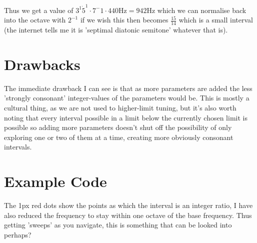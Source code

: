 \documentclass[10pt,a4paper]{article}
\begin{document}
Thus we get a value of $3^1 \dot 5^1 \cdot 7^-1 \cdot 440\si{\hertz} = 942\si{\hertz}$ which we can
normalise back into the octave with $2^{-1}$ if we wish this then becomes $\frac{15}{14}$ which is
a small interval (the internet tells me it is 'septimal diatonic semitone' whatever that is).

\section{Drawbacks}
The immediate drawback I can see is that as more parameters are added the less 'strongly consonant'
integer-values of the parameters would be. This is mostly a cultural thing, as we are not used to
higher-limit tuning, but it's also worth noting that every interval possible in a limit below the
currently chosen limit is possible so adding more parameters doesn't shut off the possibility of
only exploring one or two of them at a time, creating more obviously consonant intervals.

\section{Example Code}
The 1px red dots show the points as which the interval is an integer ratio, I have also reduced the
frequency to stay within one octave of the base frequency. Thus getting 'sweeps' as you navigate,
this is something that can be looked into perhaps?
\end{document}
